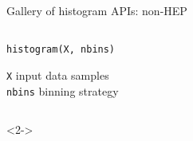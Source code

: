 \documentclass[aspectratio=169]{beamer}
\begin{document}
\begin{frame}[fragile]{Gallery of histogram APIs: non-HEP}
\begin{columns}
\begin{description}
\begin{lstlisting}
histogram(X, nbins)
\end{lstlisting}

{\tt X} input data samples \\
{\tt nbins} binning strategy

\end{description}
\end{columns}

\begin{uncoverenv}<2->
\vspace{-5 cm}
\begin{center}
\end{center}
\vspace{5 cm}
\end{uncoverenv}
\end{frame}
\end{document}

